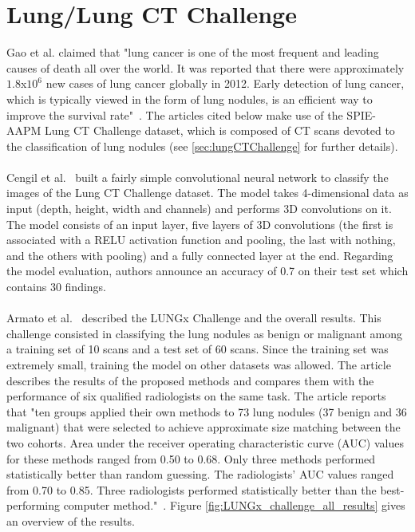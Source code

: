\section{Lung/Lung CT Challenge}
\setlength{\marginparwidth}{3cm}\leavevmode {}Gao et al. claimed that "lung cancer is one of the most frequent and leading causes of death all over the world. It was reported that there were approximately $1.8$x$10^6$ new cases of lung cancer globally in 2012. Early detection of lung cancer, which is typically viewed in the form of lung nodules, is an efficient way to improve the survival rate"~\cite{41}. The articles cited below make use of the SPIE-AAPM Lung CT Challenge dataset, which is composed of CT scans devoted to the classification of lung nodules (see \ref{sec:lungCTChallenge} for further details).\\ \\
Cengil et al.~\cite{02} built a fairly simple convolutional neural network to classify the images of the Lung CT Challenge dataset. The model takes 4-dimensional data as input (depth, height, width and channels) and performs 3D convolutions on it. The model consists of an input layer, five layers of 3D convolutions (the first is associated with a RELU activation function and pooling, the last with nothing, and the others with pooling) and a fully connected layer at the end. Regarding the model evaluation, authors announce an accuracy of 0.7 on their test set which contains 30 findings.\\ \\
Armato et al.~\cite{12} described the LUNGx Challenge and the overall results. This challenge consisted in classifying the lung nodules as benign or malignant among a training set of 10 scans and a test set of 60 scans. Since the training set was extremely small, training the model on other datasets was allowed. The article describes the results of the proposed methods and compares them with the performance of six qualified radiologists on the same task. The article reports that "ten groups applied their own methods to 73 lung nodules (37 benign and 36 malignant) that were selected to achieve approximate size matching between the two cohorts. Area under the receiver operating characteristic curve (AUC) values for these methods ranged from 0.50 to 0.68. Only three methods performed statistically better than random guessing. The radiologists’ AUC values ranged from 0.70 to 0.85. Three radiologists performed statistically better than the best-performing computer method."~\cite{12}. Figure \ref{fig:LUNGx_challenge_all_results} gives an overview of the results.

